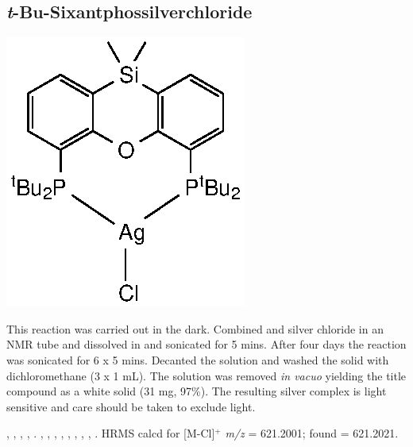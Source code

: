 \subsection*{\emph{t}-Bu-Sixantphossilverchloride} 
\begin{structure}[h]
\begin{center}
\includegraphics{../Structures/SitBuSilverChloride.eps}
\end{center}
\end{structure}

This reaction was carried out in the dark.  Combined  and silver chloride in an NMR tube and dissolved in  and sonicated for 5 mins.  After four days the reaction was sonicated for 6 x 5 mins.  Decanted the solution and washed the solid with dichloromethane (3 x 1 mL).  The solution was removed \emph{in vacuo} yielding the title compound as a white solid (31 mg, 97\%).  The resulting silver complex is light sensitive and care should be taken to exclude light.

,
,
,
,
.
,
,
,
,
,
, 
, 
,
.
HRMS calcd for  [M-Cl]$^+$ \emph{m/z} = 621.2001; found = 621.2021.

